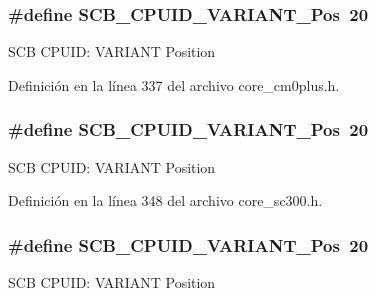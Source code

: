 \subsubsection[{\texorpdfstring{S\+C\+B\+\_\+\+C\+P\+U\+I\+D\+\_\+\+V\+A\+R\+I\+A\+N\+T\+\_\+\+Pos}{SCB_CPUID_VARIANT_Pos}}]{\setlength{\rightskip}{0pt plus 5cm}\#define S\+C\+B\+\_\+\+C\+P\+U\+I\+D\+\_\+\+V\+A\+R\+I\+A\+N\+T\+\_\+\+Pos~20}\hypertarget{group___c_m_s_i_s___s_c_b_ga104462bd0815391b4044a70bd15d3a71}{}\label{group___c_m_s_i_s___s_c_b_ga104462bd0815391b4044a70bd15d3a71}
S\+CB C\+P\+U\+ID\+: V\+A\+R\+I\+A\+NT Position 

Definición en la línea 337 del archivo core\+\_\+cm0plus.\+h.

\subsubsection[{\texorpdfstring{S\+C\+B\+\_\+\+C\+P\+U\+I\+D\+\_\+\+V\+A\+R\+I\+A\+N\+T\+\_\+\+Pos}{SCB_CPUID_VARIANT_Pos}}]{\setlength{\rightskip}{0pt plus 5cm}\#define S\+C\+B\+\_\+\+C\+P\+U\+I\+D\+\_\+\+V\+A\+R\+I\+A\+N\+T\+\_\+\+Pos~20}\hypertarget{group___c_m_s_i_s___s_c_b_ga104462bd0815391b4044a70bd15d3a71}{}\label{group___c_m_s_i_s___s_c_b_ga104462bd0815391b4044a70bd15d3a71}
S\+CB C\+P\+U\+ID\+: V\+A\+R\+I\+A\+NT Position 

Definición en la línea 348 del archivo core\+\_\+sc300.\+h.

\subsubsection[{\texorpdfstring{S\+C\+B\+\_\+\+C\+P\+U\+I\+D\+\_\+\+V\+A\+R\+I\+A\+N\+T\+\_\+\+Pos}{SCB_CPUID_VARIANT_Pos}}]{\setlength{\rightskip}{0pt plus 5cm}\#define S\+C\+B\+\_\+\+C\+P\+U\+I\+D\+\_\+\+V\+A\+R\+I\+A\+N\+T\+\_\+\+Pos~20}\hypertarget{group___c_m_s_i_s___s_c_b_ga104462bd0815391b4044a70bd15d3a71}{}\label{group___c_m_s_i_s___s_c_b_ga104462bd0815391b4044a70bd15d3a71}
S\+CB C\+P\+U\+ID\+: V\+A\+R\+I\+A\+NT Position 

